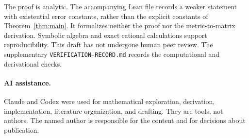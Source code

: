 \documentclass[11pt,a4paper]{article}
\numberwithin{equation}{section}
\begin{document}
The proof is analytic. The accompanying Lean file records a weaker
statement with existential error constants, rather than the explicit
constants of Theorem~\ref{thm:main}. It formalizes neither the proof nor
the metric-to-matrix derivation. Symbolic algebra and exact rational calculations support
reproducibility. This draft has not undergone human peer review.
The supplementary \texttt{VERIFICATION-RECORD.md} records the computational
and derivational checks.

\paragraph{AI assistance.}
Claude and Codex were used for mathematical exploration, derivation,
implementation, literature organization, and drafting. They are tools,
not authors. The named author is responsible for the content and for
decisions about publication.

\small

\end{document}
